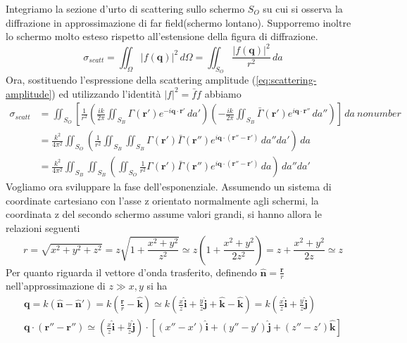 \begin{fullwidth}
    Integriamo la sezione d'urto di scattering sullo schermo $ S_O$ su cui si osserva la diffrazione in approssimazione di
    far field(schermo lontano).
    Supporremo inoltre lo schermo molto esteso rispetto all'estensione della figura di diffrazione.
    \[
        \sigma_{scatt} = \iint_{\Omega} |f(\bm{q})|^2 \, d \Omega = \iint_{S_O} \frac{|f(\bm{q})|^2}{r^2} \, da
    \]
    Ora, sostituendo l'espressione della scattering amplitude (\ref{eq:scattering-amplitude}) ed utilizzando l'identità
    $ |f|^2 = \bar{f}f$ abbiamo
    \begin{align}
        \sigma_{scatt} &= \iint_{S_O} \left[
            \frac{1}{{r}^{2}} \left(
            \frac{ik}{2 \pi} \iint_{S_B} \Gamma(\bm{r}')
            e^{-i \bm{q} \cdot \bm{r}'} \, da'
            \right)
            \left( - \frac{ik}{2 \pi} \iint_{S_B} \bar{\Gamma}(\bm{r}') e^{i \bm{q} \cdot \bm{r}''} \, da'' \right)
            \right] \,  da  \ nonumber \\
        & =  \frac{{k}^{2}}{4 \pi^2} \iint_{S_O} \left( \frac{1}{{r}^{2}} \iint_{S_B}  \iint_{S_B}
        \Gamma(\bm{r}') \bar{\Gamma}(\bm{r}'') e^{i \bm{q} \cdot (\bm{r}''-\bm{r}')} \, da'' da' \right) \, da \nonumber\\
        & = \frac{{k}^{2}}{4 \pi^2}  \iint_{S_B}  \iint_{S_B}\left(\iint_{S_O} \frac{1}{{r}^{2}}
        \Gamma(\bm{r}') \bar{\Gamma}(\bm{r}'') e^{i \bm{q} \cdot (\bm{r}''-\bm{r}')} \, da \right) \, da'' da'
        \label{eq:sigma-scattering-1}
    \end{align}
    Vogliamo ora sviluppare la fase dell'esponenziale.
    Assumendo un sistema di coordinate cartesiano con l’asse z orientato normalmente agli schermi, la coordinata z
    del secondo schermo assume valori grandi, si hanno allora le relazioni seguenti
    \[
    r = \sqrt{ x^{2}+y^{2}+z^{2} } = z \sqrt{ 1+ \frac{x^{2}+y^{2}}{z^{2}} } \simeq z \left( 1 + \frac{x^{2}+y^{2}}{2z^{2}} \right)
    = z + \frac{x^{2}+y^{2}}{2z} \simeq z
    \]
    Per quanto riguarda il vettore d'onda trasferito, definendo $\hat{ \bm{n}} = \frac{\bm{r}}{r}$ nell'approssimazione
    di $z \gg x,y$ si ha
    \begin{gather}
        \bm{q} = k (\hat{\bm{n}} - \hat{\bm{n}}') = k \left( \frac{\bm{r}}{r}  - \hat{\bm{k}}\right) \simeq k\left( \frac{x}{z}\hat{\bm{i}} + \frac{y}{z} \hat{\bm{j}} + \hat{\bm{k}} -\hat{\bm{k}}\right) = k\left( \frac{x}{z} \hat{\bm{i}} +\frac{y}{z} \hat{\bm{j}} \right)\\
        \bm{q} \cdot (\bm{r}'' - \bm{r}'') \simeq \left( \frac{x}{z} \hat{\bm{i}} + \frac{y}{z} \hat{\bm{j}} \right) \cdot [(x''-x')\hat{\bm{i}} + (y''-y')\hat{\bm{j}}+(z''-z')\hat{\bm{k}}]

\end{gather}
\end{fullwidth}
